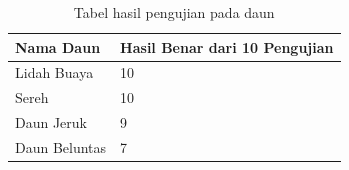 \begin{table}[ht]
	\centering
	\begin{tabularx}{1.0\textwidth}
		{|X|X|}
		\hline
		\rowcolor{lightgray} \centering Nama Daun& Hasil Benar dari 10 Pengujian\\ \hline
		\centering Lidah Buaya	& 	10 \\ \hline
		\centering Sereh	& 10  \\ \hline
		\centering Daun Jeruk	&	9 \\ \hline
		\centering Daun Beluntas	& 7	\\ \hline
	\end{tabularx}
	\caption{Tabel hasil pengujian pada daun}
	\label{table:hasil}
\end{table}



